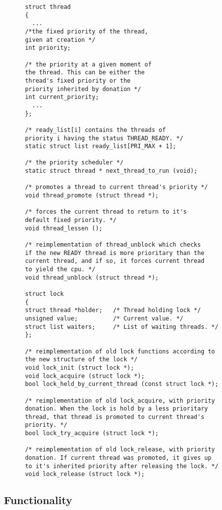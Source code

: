     \begin{lstlisting}
      struct thread
      {
	    ...
	  /*the fixed priority of the thread,
	  given at creation */
	  int priority;
	  
	  /* the priority at a given moment of
	  the thread. This can be either the
	  thread's fixed priority or the 
	  priority inherited by donation */
	  int current_priority;		
	    ...
      };

      /* ready_list[i] contains the threads of
      priority i having the status THREAD_READY. */
      static struct list ready_list[PRI_MAX + 1];

      /* the priority scheduler */
      static struct thread * next_thread_to_run (void);

      /* promotes a thread to current thread's priority */
      void thread_promote (struct thread *);
      
      /* forces the current thread to return to it's
      default fixed priority. */
      void thread_lessen ();

      /* reimplementation of thread_unblock which checks 
      if the new READY thread is more prioritary than the 
      current thread, and if so, it forces current thread 
      to yield the cpu. */
      void thread_unblock (struct thread *);

      struct lock 
      {
	  struct thread *holder;   /* Thread holding lock */
	  unsigned value;          /* Current value. */
	  struct list waiters;     /* List of waiting threads. */
      };

      /* reimplementation of old lock functions according to
      the new structure of the lock */
      void lock_init (struct lock *);
      void lock_acquire (struct lock *);
      bool lock_held_by_current_thread (const struct lock *);

      /* reimplementation of old lock_acquire, with priority
      donation. When the lock is hold by a less prioritary
      thread, that thread is promoted to current thread's
      priority. */
      bool lock_try_acquire (struct lock *);

      /* reimplementation of old lock_release, with priority
      donation. If current thread was promoted, it gives up
      to it's inherited priority after releasing the lock. */
      void lock_release (struct lock *);      

    \end{lstlisting}


    \subsection{Functionality}

